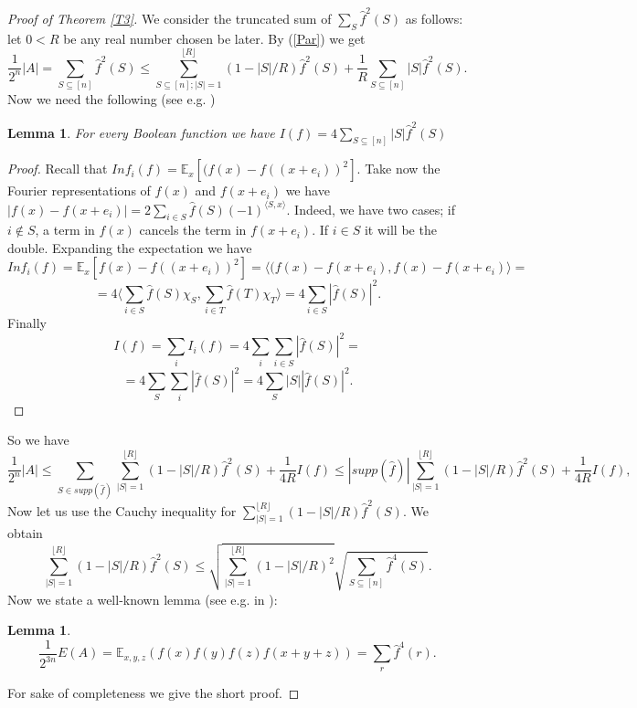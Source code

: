 \documentclass[12pt]{amsart}%
\newtheorem{lemma}[thm]{\bf Lemma}
\theoremstyle{definition}
\begin{document}
\begin{proof}[Proof of Theorem \ref{T3}]


We consider the truncated sum of $\sum_S\widehat{f}^2(S)$ as follows: let $0<R$ be any real number chosen be later. By (\ref{Par}) we get
$$
\frac{1}{2^n}|A|=\sum_{S\subseteq [n]}\widehat{f}^2(S)\leq  \sum^{\lfloor R\rfloor}_{S\subseteq [n]; |S|=1}(1- |S|/R)\widehat{f}^2(S)+\frac{1}{R}\sum_{S\subseteq [n]}|S|\widehat{f}^2(S).
$$
Now we need the following (see e.g. \cite{1})
\begin{lemma}
For every Boolean function we have
$I(f)=4\sum_{S\subseteq [n]}|S|\widehat{f}^2(S)$
\end{lemma}
\begin{proof}
Recall that $Inf_i(f)= \mathbb{E}_x[(f(x)- f((x+e_i))^2]$. 
Take now the Fourier representations of $f(x)$ and  $f(x+e_i)$ we have $|f(x)- f(x+e_i)|=2\sum_{i\in S}\widehat{f}(S)(-1)^{\langle S,x\rangle}$. Indeed, we have two cases; if $i\not \in S$, a term in $f(x)$ cancels the term in $f(x+e_i)$. If $i \in S$ it will be the double. Expanding the expectation we have
$$
Inf_i(f)= \mathbb{E}_x[f(x)- f((x+e_i))^2]=\langle (f(x)- f(x+e_i),f(x)- f(x+e_i)\rangle=
$$
$$
=4\langle \sum_{i\in S}\widehat{f}(S)\chi_S,\sum_{i\in T}\widehat{f}(T)\chi_T\rangle=4\sum_{i\in S}|\widehat{f}(S)|^2.
$$
Finally
$$
I(f)=\sum_iI_i(f)=4\sum_i\sum_{i\in S}|\widehat{f}(S)|^2=
$$
$$
=4\sum_S\sum_{i}|\widehat{f}(S)|^2=4\sum_{S}|S||\widehat{f}(S)|^2.
$$
\end{proof}

So we have
$$
\frac{1}{2^n}|A|\leq \sum_{S\in supp(\widehat{f})}\sum^{\lfloor R\rfloor}_{|S|=1}(1- |S|/R)\widehat{f}^2(S)+\frac{1}{4R} I(f)\leq |supp(\widehat{f})|\sum^{\lfloor R\rfloor}_{|S|=1}(1- |S|/R)\widehat{f}^2(S)+\frac{1}{4R} I(f),
$$
 Now let us use the Cauchy inequality for $\sum^{\lfloor R\rfloor}_{|S|=1}(1- |S|/R)\widehat{f}^2(S)$. We obtain
$$
\sum^{\lfloor R\rfloor}_{|S|=1}(1- |S|/R)\widehat{f}^2(S)\leq \sqrt{\sum^{\lfloor R\rfloor}_{|S|=1}(1- |S|/R)^2}\sqrt{\sum_{S\subseteq [n]}\widehat{f}^4(S)}.
$$
Now we state a well-known lemma (see e.g. in \cite{1}):
\begin{lemma}
\begin{equation}\label{2}
\frac{1}{2^{3n}}E(A)=\mathbb{E}_{x,y,z}(f(x)f(y)f(z)f(x+y+z))=\sum_r\widehat{f}^4(r).
\end{equation}
\end{lemma}
For sake of completeness we give the short proof.


\end{proof}
\end{document}
